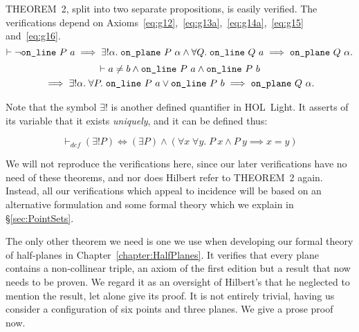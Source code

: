 THEOREM~2, split into two separate propositions, is easily verified. The verifications depend on Axioms~\ref{eq:g12},~\ref{eq:g13a},~\ref{eq:g14a},~\ref{eq:g15} and~\ref{eq:g16}.
\begin{displaymath}
  \vdash\neg\texttt{on\_line}\ P\ a \implies \exists!\alpha.\; \texttt{on\_plane}\ P\ \alpha \wedge \forall Q.\; \texttt{on\_line}\ Q\ a \implies \texttt{on\_plane}\ Q\ \alpha.
\end{displaymath}
\begin{multline*}
  \vdash a\neq b\wedge\texttt{on\_line}\ P\ a\wedge\texttt{on\_line}\ P\ b\\
  \implies\exists!\alpha.\; \forall P.\; \texttt{on\_line}\ P\ a \vee \texttt{on\_line}\ P\ b \implies\texttt{on\_plane}\ Q\ \alpha.
\end{multline*}

Note that the symbol $\exists!$ is another defined quantifier in HOL~Light. It asserts of its variable that it exists \emph{uniquely}, and it can be defined thus:

\begin{displaymath}
  \vdash_{def}(\exists! P) \iff (\exists P) \wedge (\forall x\;\forall y.\; P\ x \wedge P\ y \implies x = y)
\end{displaymath}

We will not reproduce the verifications here, since our later verifications have no need of these theorems, and nor does Hilbert refer to THEOREM~2 again. Instead, all our verifications which appeal to incidence will be based on an alternative formulation and some formal theory which we explain in \S\ref{sec:PointSets}.

The only other theorem we need is one we use when developing our formal theory of half-planes in Chapter~\ref{chapter:HalfPlanes}. It verifies that every plane contains a non-collinear triple, an axiom of the first edition but a result that now needs to be proven. We regard it as an oversight of Hilbert's that he neglected to mention the result, let alone give its proof. It is not entirely trivial, having us consider a configuration of six points and three planes. We give a prose proof now.

